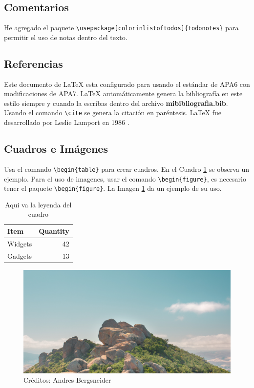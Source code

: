 \documentclass[doc, 12pt, letterpaper, donotrepeattitle, floatsintext, apacite]{apa6}    %
\newcommand{\latex}{\LaTeX\xspace}  %
\begin{document}
\subsection{Comentarios} 
He agregado el paquete \verb|\usepackage[colorinlistoftodos]{todonotes}| para permitir el uso de notas dentro del texto.


\subsection{Referencias} 
Este documento de \latex esta configurado para usando el estándar de APA6 con modificaciones de APA7. \latex automáticamente genera la bibliografía en este estilo siempre y cuando la escribas dentro del archivo \textbf{mibibliografia.bib}. Usando el comando \verb|\cite| se genera la citación en paréntesis. \latex fue desarrollado por Leslie Lamport en 1986 \cite{lamport1986}.

\subsection{Cuadros e Imágenes}
Usa el comando \verb|\begin{table}| para crear cuadros. En el Cuadro \ref{cuadro:ejemplo} se  observa un ejemplo.
Para el uso de imagenes, usar el comando \verb|\begin{figure}|, es necesario tener el paquete \verb|\begin{figure}|. La Imagen \ref{imagen:ejemplo} da un ejemplo de su uso.

\begin{table}[h] %
    \centering
    \begin{tabular}{l|r}
        Item & Quantity \\\hline
        Widgets & 42 \\
        Gadgets & 13
    \end{tabular}
    \caption{Aqui va la leyenda del cuadro}
    \label{cuadro:ejemplo}
\end{table}

\begin{figure}[H]
    \centering
    \includegraphics[width=.7\textwidth]{Imágenes/ARB-7747.jpg}
    \caption{Créditos: Andres Bergsneider}
    \label{imagen:ejemplo}
\end{figure}
\end{document}
